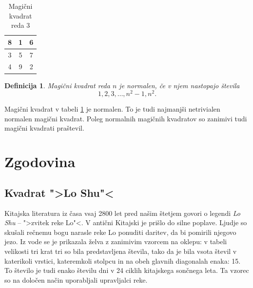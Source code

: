\documentclass[a4paper,12pt]{article}
\newtheorem{definicija}{Definicija}
\begin{document}
\begin{table}[!ht]
   \centering
   \caption{Magični kvadrat reda 3}
   \large\begin{tabular}{|| c || c || c ||}\toprule
      8 & 1 & 6 \\\midrule
      3 & 5 & 7 \\\midrule
      4 & 9 & 2 \\\bottomrule
	\end{tabular}\normalsize
\label{table:mag3}
\end{table}
\begin{definicija}
   Magični kvadrat reda \(n\) je \emph{normalen}, če v njem nastopajo števila
   \begin{equation}
      \label{eq:numbers}
      1, 2, 3, \ldots, n^2-1, n^2.
   \end{equation}
\end{definicija}

Magični kvadrat v tabeli \ref{table:mag3} je normalen.
To je tudi najmanjši netrivialen normalen magični kvadrat.
Poleg normalnih magičnih kvadratov so zanimivi tudi magični kvadrati praštevil. %


\section{Zgodovina}

\subsection{Kvadrat ">Lo Shu"<}

Kitajska literatura iz časa vsaj 2800 let pred našim štetjem govori o legendi
\emph{Lo Shu} -- ">zvitek reke Lo"<. V antični Kitajski je prišlo do
silne poplave. Ljudje so skušali rečnemu bogu narasle reke Lo ponuditi daritev,
da bi pomirili njegovo jezo. Iz vode se je prikazala želva z zanimivim vzorcem
na oklepu: v tabeli velikosti tri krat tri so bila predstavljena števila, tako
da je bila vsota števil v katerikoli vrstici, kateremkoli stolpcu in na obeh
glavnih diagonalah enaka: 15. To število je tudi enako številu dni v 24 ciklih
kitajskega sončnega leta. Ta vzorec so na določen način uporabljali upravljalci
reke.
\end{document}
